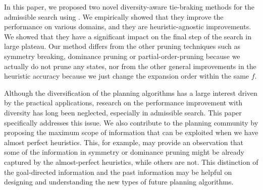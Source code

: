 
In this paper, we proposed two novel diversity-aware tie-braking methods for the admissible search using \astar. We empirically showed that they improve the performance on various domains, and they are heuristic-agnostic improvements. We showed that they have a significant impact on the final step of the search in large plateau.
Our method differs from the other pruning techniques such as symmetry breaking, dominance pruning or partial-order-pruning because we actually do not prune any states, nor from the other general improvements in the heuristic accuracy because we just change the expansion order within the same $f$.


Although the diversification of the planning algorithms has a large interest driven by the practical applications, research on the performance improvement with diversity has long been neglected, especially in admissible search. This paper specifically addresses this issue. We also  contribute to the planning community by proposing the maximum scope of information that can be exploited when we have almost perfect heuristics. This, for example, may provide an observation that some of the information in symmetry or dominance pruning might be already captured by the almost-perfect heuristics, while others are not. This distinction of the goal-directed information and the past information may be helpful on designing and understanding the new types of future planning algorithms.
